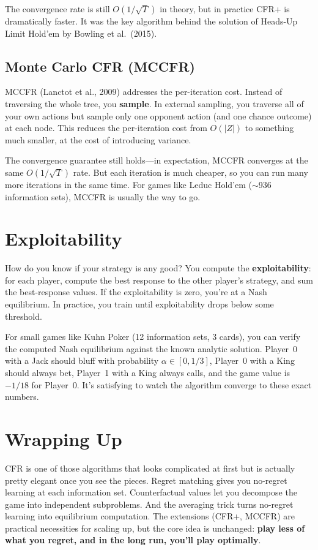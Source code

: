 \documentclass[11pt]{article}
\begin{document}
The convergence rate is still $O(1/\sqrt{T})$ in theory, but in practice CFR+ is dramatically faster. It was the key algorithm behind the solution of Heads-Up Limit Hold'em by Bowling et al.\ (2015).

\subsection{Monte Carlo CFR (MCCFR)}

MCCFR (Lanctot et al., 2009) addresses the per-iteration cost. Instead of traversing the whole tree, you \textbf{sample}. In external sampling, you traverse all of your own actions but sample only one opponent action (and one chance outcome) at each node. This reduces the per-iteration cost from $O(|Z|)$ to something much smaller, at the cost of introducing variance.

The convergence guarantee still holds---in expectation, MCCFR converges at the same $O(1/\sqrt{T})$ rate. But each iteration is much cheaper, so you can run many more iterations in the same time. For games like Leduc Hold'em ($\sim$936 information sets), MCCFR is usually the way to go.

\section{Exploitability}

How do you know if your strategy is any good? You compute the \textbf{exploitability}: for each player, compute the best response to the other player's strategy, and sum the best-response values. If the exploitability is zero, you're at a Nash equilibrium. In practice, you train until exploitability drops below some threshold.

For small games like Kuhn Poker (12 information sets, 3 cards), you can verify the computed Nash equilibrium against the known analytic solution. Player~0 with a Jack should bluff with probability $\alpha \in [0, 1/3]$, Player~0 with a King should always bet, Player~1 with a King always calls, and the game value is $-1/18$ for Player~0. It's satisfying to watch the algorithm converge to these exact numbers.

\section{Wrapping Up}

CFR is one of those algorithms that looks complicated at first but is actually pretty elegant once you see the pieces. Regret matching gives you no-regret learning at each information set. Counterfactual values let you decompose the game into independent subproblems. And the averaging trick turns no-regret learning into equilibrium computation. The extensions (CFR+, MCCFR) are practical necessities for scaling up, but the core idea is unchanged: \textbf{play less of what you regret, and in the long run, you'll play optimally}.
\end{document}
